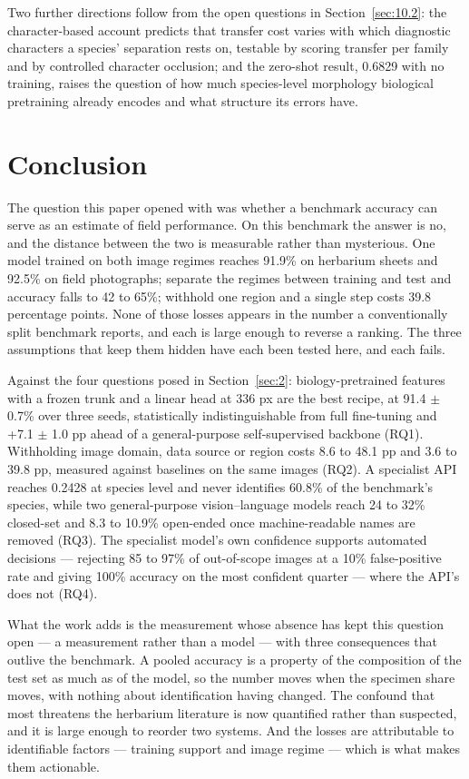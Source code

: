 \documentclass[preprint,12pt,authoryear]{elsarticle}
\begin{document}
Two further directions follow from the open questions in Section~\ref{sec:10.2}: the character-based account predicts that transfer cost varies with which diagnostic characters a species' separation rests on, testable by scoring transfer per family and by controlled character occlusion; and the zero-shot result, 0.6829 with no training, raises the question of how much species-level morphology biological pretraining already encodes and what structure its errors have.

\setcounter{section}{10}

\section{Conclusion}\label{sec:11}

The question this paper opened with was whether a benchmark accuracy can serve as an estimate of field performance. On this benchmark the answer is no, and the distance between the two is measurable rather than mysterious. One model trained on both image regimes reaches 91.9\% on herbarium sheets and 92.5\% on field photographs; separate the regimes between training and test and accuracy falls to 42 to 65\%; withhold one region and a single step costs 39.8 percentage points. None of those losses appears in the number a conventionally split benchmark reports, and each is large enough to reverse a ranking. The three assumptions that keep them hidden have each been tested here, and each fails.

Against the four questions posed in Section~\ref{sec:2}: biology-pretrained features with a frozen trunk and a linear head at 336 px are the best recipe, at 91.4 $\pm$ 0.7\% over three seeds, statistically indistinguishable from full fine-tuning and +7.1 $\pm$ 1.0 pp ahead of a general-purpose self-supervised backbone (RQ1). Withholding image domain, data source or region costs 8.6 to 48.1 pp and 3.6 to 39.8 pp, measured against baselines on the same images (RQ2). A specialist API reaches 0.2428 at species level and never identifies 60.8\% of the benchmark's species, while two general-purpose vision--language models reach 24 to 32\% closed-set and 8.3 to 10.9\% open-ended once machine-readable names are removed (RQ3). The specialist model's own confidence supports automated decisions --- rejecting 85 to 97\% of out-of-scope images at a 10\% false-positive rate and giving 100\% accuracy on the most confident quarter --- where the API's does not (RQ4).

What the work adds is the measurement whose absence has kept this question open --- a measurement rather than a model --- with three consequences that outlive the benchmark. A pooled accuracy is a property of the composition of the test set as much as of the model, so the number moves when the specimen share moves, with nothing about identification having changed. The confound that most threatens the herbarium literature is now quantified rather than suspected, and it is large enough to reorder two systems. And the losses are attributable to identifiable factors --- training support and image regime --- which is what makes them actionable.
\end{document}
